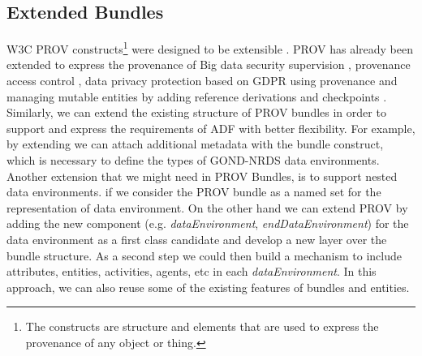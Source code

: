 \subsection{Extended Bundles}   

W3C PROV constructs\footnote{The constructs are  structure and elements that are used to express the provenance of any object or thing.} were designed to be extensible \cite{moreau2015rationale}. PROV has already been extended to express the provenance of Big data security supervision \cite{gao2020big}, provenance access control \cite{missier2020abstracting}, data privacy protection based on GDPR using provenance \cite{davari2019access} and  managing mutable entities by adding reference derivations and checkpoints \cite{pimentel2018versioned}.
Similarly, we can extend the existing structure of PROV bundles in order to support and express the requirements of ADF  with better flexibility. For example, by extending we can attach  additional metadata with the bundle construct, which is necessary to define the types of  GOND-NRDS data environments. Another extension that we might need in PROV Bundles, is to support  nested data environments. if we consider the PROV bundle as a named set for the representation of data environment. On the other hand we can extend PROV by adding the new component (e.g. \textit{dataEnvironment}, \textit{endDataEnvironment}) for the data environment as a first class candidate and develop a new layer over the bundle structure. As a second step we could then build a mechanism to include attributes, entities, activities, agents, etc in each \textit{dataEnvironment}. In this approach, we can also reuse some of the existing features of bundles and entities. 

